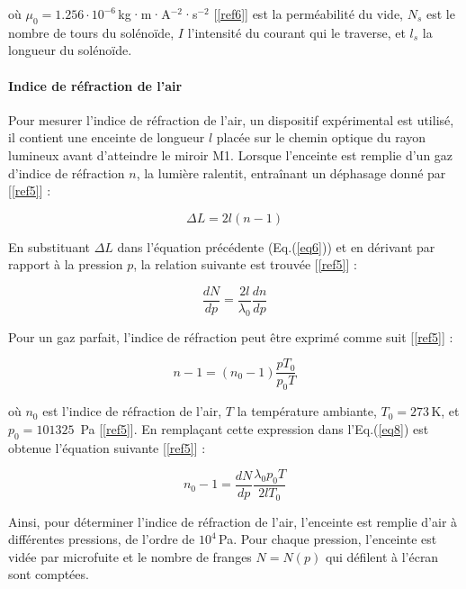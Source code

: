 \documentclass[a4paper, 12pt,oneside]{article}
\begin{document}
\noindent où $\mu_0=1.256 \cdot 10^{-6}$\,kg·m·A$^{-2}$·s$^{-2}$ [\ref{ref6}] est la perméabilité du vide, $N_s$ est le nombre de tours du solénoïde, $I$ l’intensité du courant qui le traverse, et $l_s$ la longueur du solénoïde.

\paragraph{Indice de réfraction de l'air}

Pour mesurer l'indice de réfraction de l'air, un dispositif expérimental est utilisé, il contient une enceinte de longueur $l$ placée sur le chemin optique du rayon lumineux avant d'atteindre le miroir M1. Lorsque l'enceinte est remplie d'un gaz d'indice de réfraction $n$, la lumière ralentit, entraînant un déphasage donné par [\ref{ref5}] :

\begin{equation}
    \Delta L = 2l(n - 1)
\label{eq6}
\end{equation}

En substituant $\Delta L$ dans l'équation précédente (Eq.(\ref{eq6})) et en dérivant par rapport à la pression $p$, la relation suivante est trouvée [\ref{ref5}] :

\begin{equation}
    \frac{dN}{dp} = \frac{2l}{\lambda_0} \frac{dn}{dp}
\label{eq7}
\end{equation}

Pour un gaz parfait, l'indice de réfraction peut être exprimé comme suit [\ref{ref5}] :

\begin{equation}
    n - 1 = (n_0 - 1)\frac{p T_0}{p_0 T}
\label{eq8}
\end{equation}

où $n_0$ est l'indice de réfraction de l'air, $T$ la température ambiante, $T_0 = 273 \,$K, et $p_0 = 101325 \,$ Pa [\ref{ref5}]. En remplaçant cette expression dans l’Eq.(\ref{eq8}) est obtenue l'équation suivante [\ref{ref5}] :

\begin{equation}
    n_0 - 1 = \frac{dN}{dp} \frac{\lambda_0 p_0 T}{2l T_0}
\label{eq9}
\end{equation}

Ainsi, pour déterminer l'indice de réfraction de l'air, l'enceinte est remplie d'air à différentes pressions, de l'ordre de $10^4$\,Pa. Pour chaque pression, l’enceinte est vidée par microfuite et le nombre de franges $N = N(p)$ qui défilent à l'écran sont comptées.
\end{document}
